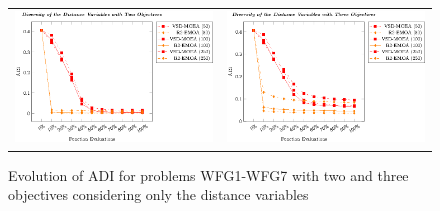 \begin{figure}[t]
\centering
\setlength{\tabcolsep}{0.0em}
\begin{tabular}{c c}
\includegraphics[scale=0.75]{Images/Graphic-Diversity_2obj_tikz-figure1.eps} & \includegraphics[scale=0.75]{Images/Graphic-Diversity_3obj_tikz-figure1.eps}
\end{tabular}
\caption{Evolution of ADI for problems WFG1-WFG7 with two and three objectives considering only the distance variables}\label{fig:Diversity}
\end{figure}

